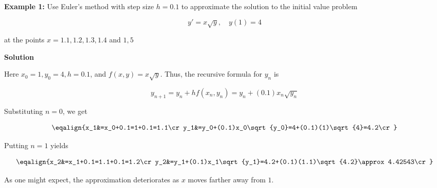 \nopagenumbers
{\bf Example 1:} Use Euler's method with step size $h=0.1$ to approximate the solution to the initial value problem

$$y'=x\sqrt{y},\quad y(1)=4$$

at the points $x=1.1,1.2,1.3,1.4$ and $1,5$


\vskip 10pt
{\bf Solution}

\vskip 6pt
Here $x_0=1,y_0=4,h=0.1$, and $f(x,y)=x\sqrt{y}$. Thus, the recursive formula for $y_n$ is

$$y_{n+1}=y_n+hf(x_n,y_n)=y_n+(0.1)x_n\sqrt{y_n}$$

Substituting $n=0$, we get

$$\eqalign{x_1&=x_0+0.1=1+0.1=1.1\cr
		y_1&=y_0+(0.1)x_0\sqrt{y_0}=4+(0.1)(1)\sqrt{4}=4.2\cr}$$

Putting $n=1$ yields

$$\eqalign{x_2&=x_1+0.1=1.1+0.1=1.2\cr
		y_2&=y_1+(0.1)x_1\sqrt{y_1}=4.2+(0.1)(1.1)\sqrt{4.2}\approx 4.42543\cr}$$

As one might expect, the approximation deteriorates as $x$ moves farther away from $1$.


\vfill\eject
\bye
